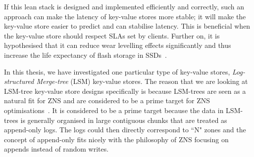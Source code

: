 If this lean stack is designed and implemented efficiently and correctly, such an approach can make the latency of key-value stores more stable; it will make the key-value store easier to predict and can stabilise latency. This is beneficial when the key-value store should respect SLAs set by clients. Further on, it is hypothesised that it can reduce wear levelling effects significantly and thus increase the life expectancy of flash storage in SSDs~\cite{purandareappend,bjorling2021zns}.

In this thesis, we have investigated one particular type of key-value stores, \textit{Log-structured Merge-tree} (LSM) key-value stores. The reason that we are looking at LSM-tree key-value store designs specifically is because LSM-trees are seen as a natural fit for ZNS and are considered to be a prime target for ZNS optimisations~\cite{purandareappend, stavrinos2021don}. It is considered to be a prime target because the data in LSM-trees is generally organised in large contiguous chunks that are treated as append-only logs. The logs could then directly correspond to ``N" zones and the concept of append-only fits nicely with the philosophy of ZNS focusing on appends instead of random writes.

